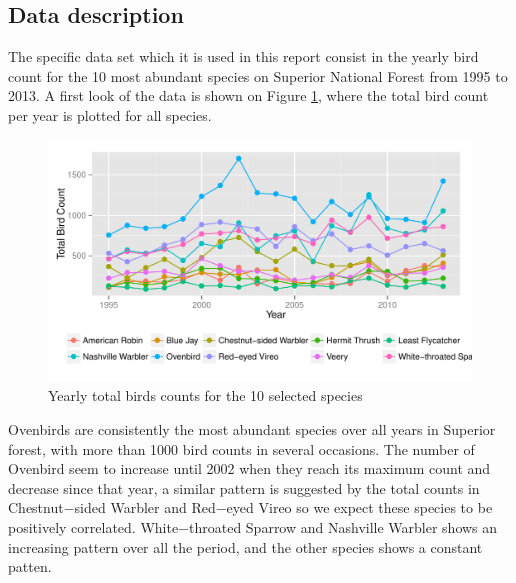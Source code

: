 \documentclass[a4paper]{article}
\begin{document}
\subsection{Data description}
The specific data set which it is used in this report consist in the yearly bird count for the 10 most abundant species on Superior National Forest from 1995 to 2013.  A first look of the data is shown on Figure \ref{figtr}, where the total bird count per year is plotted for all species. 
\begin{figure}[hbpt]
\centering
\includegraphics[width =\textwidth]{rawtrend}
 \vspace{-.5in}
\caption{Yearly total birds counts for the 10 selected species \label{figtr} }
\end{figure}

Ovenbirds are consistently the most abundant species over all years in Superior forest,  with more than 1000 bird counts in several occasions. The number of Ovenbird seem to increase until 2002 when they reach its maximum count and decrease since that year, a similar pattern is suggested by the total counts in Chestnut−sided Warbler and Red−eyed Vireo so we expect these species to be positively correlated.  White−throated Sparrow and Nashville Warbler shows an increasing pattern over all the period, and the other species shows a constant patten.  
%
\end{document}
